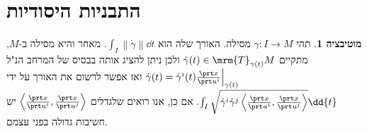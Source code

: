 \documentclass{article}
\theoremstyle{definition}
\newtheorem*{motivation*}{מוטיבציה}
\newcommand{\norm}[1]{\left\lVert#1\right\rVert}
\begin{document}
	\section{התבניות היסודיות}
	
	\begin{motivation*}
		תהי
		\(\gamma: I \to M\)
		מסילה.
		האורך שלה הוא
		\(\int_I \norm{\dot\gamma} \dd{t}\).
		מאחר והיא מסילה ב-\(M\), מתקיים
		\(\dot\gamma(t) \in \mrm{T}_{\gamma(t)} M\)
		ולכן ניתן להציג אותה בבסיס של המרחב הנ"ל
		\(\dot\gamma(t)=\dot{\gamma}^i(t) \frac{\prt x}{\prt u^i}\Big|_{\gamma(t)} \)
		ואז אפשר לרשום את האורך על ידי
		\(\int_I \sqrt{\dot{\gamma}^i \dot{\gamma}^j \left\langle \frac{\prt x}{\prt u^i},\frac{\prt x}{\prt u^j} \right\rangle} \dd{t}\).
		אם כן, אנו רואים שלגדלים
		\(\left\langle \frac{\prt x}{\prt u^i},\frac{\prt x}{\prt u^j} \right\rangle\)
		יש חשיבות גדולה בפני עצמם.
	\end{motivation*}
	
\end{document}
